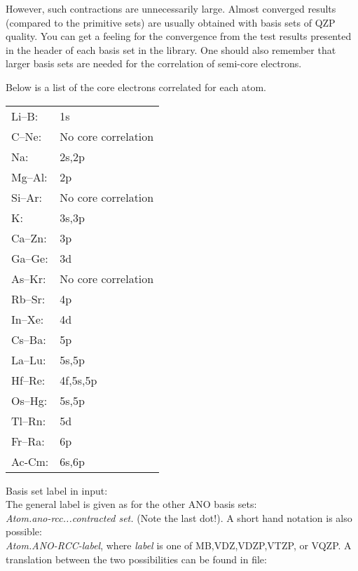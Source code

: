 However, such contractions are unnecessarily large. Almost converged
results (compared to the primitive sets) are usually obtained with basis
sets of QZP quality. You can get a feeling for the convergence from the test
results presented in the header of each basis set in the library. One should
also remember that larger basis sets are needed for the correlation of semi-core
electrons.

Below is a list of the core electrons correlated for each atom.

\begin{tabular}{ll}
Li--B:  & 1s\\
C--Ne:  & No core correlation\\
Na:     & 2s,2p\\
Mg--Al: & 2p\\
Si--Ar: & No core correlation\\
K:      & 3s,3p\\
Ca--Zn: & 3p\\
Ga--Ge: & 3d\\
As--Kr: & No core correlation\\
Rb--Sr: & 4p\\
In--Xe: & 4d\\
Cs--Ba: & 5p\\
La--Lu: & 5s,5p\\
Hf--Re: & 4f,5s,5p\\
Os--Hg: & 5s,5p\\
Tl--Rn: & 5d\\
Fr--Ra: & 6p\\
Ac-Cm:  & 6s,6p
\end{tabular}

Basis set label in input:\\
The general label is given as for the other ANO basis sets:\\
{\em Atom.ano-rcc...contracted set.} (Note the last dot!).
A short hand notation is also possible:\\
{\em Atom.ANO-RCC-label}, where {\em label} is one of MB,VDZ,VDZP,VTZP, or VQZP.
A translation between the two possibilities can be found in file:
